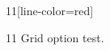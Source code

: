 \documentclass[paper=A4]{ropas-poster}
\begin{document}
\begin{postergrid}{1}{1}[line-color=red]
\begin{posterblock}{1}{1}
Grid option test.
\end{posterblock}
\end{postergrid}
\end{document}
